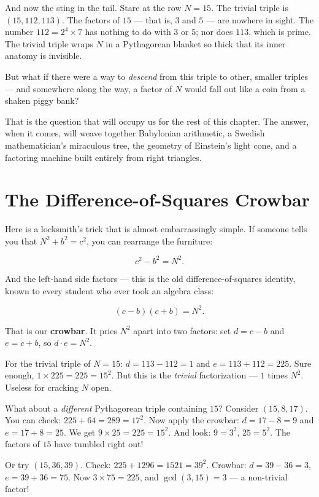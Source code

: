 \documentclass[11pt,twoside,openright]{book}
\theoremstyle{definition}
\theoremstyle{remark}
\begin{document}
And now the sting in the tail. Stare at the row $N = 15$. The trivial triple is $(15, 112, 113)$. The factors of $15$ --- that is, $3$ and $5$ --- are nowhere in sight. The number $112 = 2^4 \times 7$ has nothing to do with $3$ or $5$; nor does $113$, which is prime. The trivial triple wraps $N$ in a Pythagorean blanket so thick that its inner anatomy is invisible.

But what if there were a way to \textit{descend} from this triple to other, smaller triples --- and somewhere along the way, a factor of $N$ would fall out like a coin from a shaken piggy bank?

That is the question that will occupy us for the rest of this chapter. The answer, when it comes, will weave together Babylonian arithmetic, a Swedish mathematician's miraculous tree, the geometry of Einstein's light cone, and a factoring machine built entirely from right triangles.


\section{The Difference-of-Squares Crowbar}

Here is a locksmith's trick that is almost embarrassingly simple. If someone tells you that $N^2 + b^2 = c^2$, you can rearrange the furniture:

\[c^2 - b^2 = N^2.\]

And the left-hand side factors --- this is the old difference-of-squares identity, known to every student who ever took an algebra class:

\[(c - b)(c + b) = N^2.\]

That is our \textbf{crowbar}. It pries $N^2$ apart into two factors: set $d = c - b$ and $e = c + b$, so $d \cdot e = N^2$.

For the trivial triple of $N = 15$: $d = 113 - 112 = 1$ and $e = 113 + 112 = 225$. Sure enough, $1 \times 225 = 225 = 15^2$. But this is the \textit{trivial} factorization --- $1$ times $N^2$. Useless for cracking $N$ open.

What about a \textit{different} Pythagorean triple containing $15$? Consider $(15, 8, 17)$. You can check: $225 + 64 = 289 = 17^2$. Now apply the crowbar: $d = 17 - 8 = 9$ and $e = 17 + 8 = 25$. We get $9 \times 25 = 225 = 15^2$. And look: $9 = 3^2$, $25 = 5^2$. The factors of $15$ have tumbled right out!

Or try $(15, 36, 39)$. Check: $225 + 1296 = 1521 = 39^2$. Crowbar: $d = 39 - 36 = 3$, $e = 39 + 36 = 75$. Now $3 \times 75 = 225$, and $\gcd(3, 15) = 3$ --- a non-trivial factor!
\end{document}
